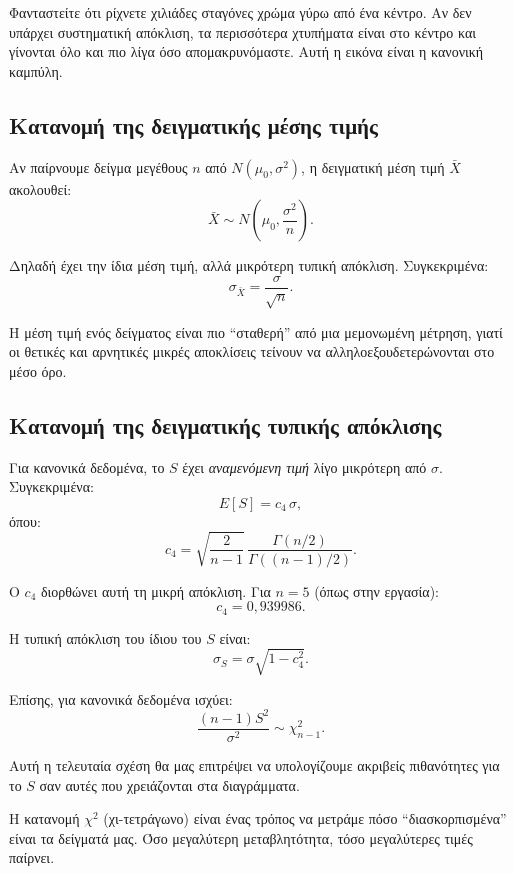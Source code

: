 \documentclass[12pt,a4paper]{article}
\begin{document}
\begin{intuition}
Φανταστείτε ότι ρίχνετε χιλιάδες σταγόνες χρώμα γύρω από ένα κέντρο. Αν δεν
υπάρχει συστηματική απόκλιση, τα περισσότερα χτυπήματα είναι στο κέντρο και
γίνονται όλο και πιο λίγα όσο απομακρυνόμαστε. Αυτή η εικόνα είναι η
κανονική καμπύλη.
\end{intuition}

\subsection{Κατανομή της δειγματικής μέσης τιμής}

Αν παίρνουμε δείγμα μεγέθους \(n\) από \(N(\mu_0,\sigma^2)\), η δειγματική
μέση τιμή \(\bar X\) ακολουθεί:
\[
    \bar X\sim N\!\left(\mu_0,\frac{\sigma^2}{n}\right).
\]

Δηλαδή έχει την ίδια μέση τιμή, αλλά μικρότερη τυπική απόκλιση. Συγκεκριμένα:
\[
    \sigma_{\bar X}=\frac{\sigma}{\sqrt n}.
\]

\begin{intuition}
Η μέση τιμή ενός δείγματος είναι πιο ``σταθερή'' από μια μεμονωμένη μέτρηση,
γιατί οι θετικές και αρνητικές μικρές αποκλίσεις τείνουν να αλληλοεξουδετερώνονται
στο μέσο όρο.
\end{intuition}

\subsection{Κατανομή της δειγματικής τυπικής απόκλισης}

Για κανονικά δεδομένα, το \(S\) έχει \emph{αναμενόμενη τιμή} λίγο μικρότερη
από \(\sigma\). Συγκεκριμένα:
\[
    E[S]=c_4\,\sigma,
\]
όπου:
\[
    c_4=\sqrt{\frac{2}{n-1}}\,\frac{\Gamma(n/2)}{\Gamma((n-1)/2)}.
\]

Ο \(c_4\) διορθώνει αυτή τη μικρή απόκλιση. Για \(n=5\) (όπως στην εργασία):
\[
    c_4=0{,}939986.
\]

Η τυπική απόκλιση του ίδιου του \(S\) είναι:
\[
    \sigma_S=\sigma\sqrt{1-c_4^2}.
\]

Επίσης, για κανονικά δεδομένα ισχύει:
\[
    \frac{(n-1)S^2}{\sigma^2}\sim\chi^2_{n-1}.
\]

Αυτή η τελευταία σχέση θα μας επιτρέψει να υπολογίζουμε ακριβείς πιθανότητες
για το \(S\) σαν αυτές που χρειάζονται στα διαγράμματα.

\begin{intuition}
Η κατανομή \(\chi^2\) (χι-τετράγωνο) είναι ένας τρόπος να μετράμε πόσο
``διασκορπισμένα'' είναι τα δείγματά μας. Όσο μεγαλύτερη μεταβλητότητα, τόσο
μεγαλύτερες τιμές παίρνει.
\end{intuition}
\end{document}
